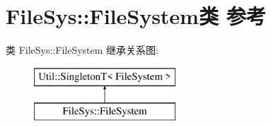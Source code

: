 \hypertarget{class_file_sys_1_1_file_system}{\section{File\-Sys\-:\-:File\-System类 参考}
\label{class_file_sys_1_1_file_system}
}
类 File\-Sys\-:\-:File\-System 继承关系图\-:\begin{figure}[H]
\begin{center}
\leavevmode
\includegraphics[height=2.000000cm]{class_file_sys_1_1_file_system}
\end{center}
\end{figure}
